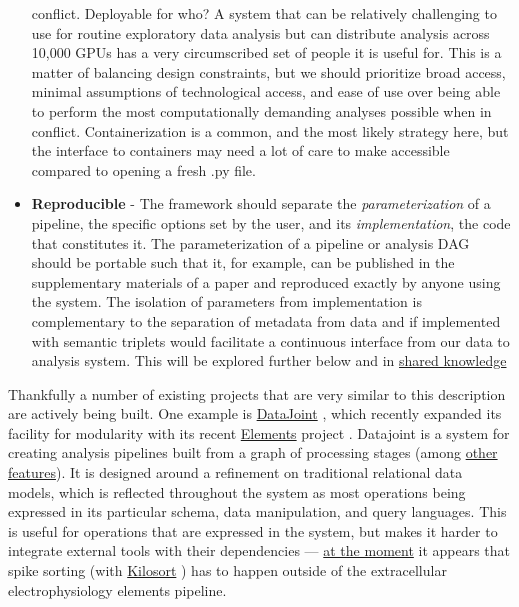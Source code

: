 \documentclass[10pt]{article}
\begin{document}
\begin{multicols}{2}
\begin{itemize}
  conflict. Deployable for who? A system that can be relatively
  challenging to use for routine exploratory data analysis but can
  distribute analysis across 10,000 GPUs has a very circumscribed set of
  people it is useful for. This is a matter of balancing design
  constraints, but we should prioritize broad access, minimal
  assumptions of technological access, and ease of use over being able
  to perform the most computationally demanding analyses possible when
  in conflict. Containerization is a common, and the most likely
  strategy here, but the interface to containers may need a lot of care
  to make accessible compared to opening a fresh .py file.
\item
  \textbf{Reproducible} - The framework should separate the
  \emph{parameterization} of a pipeline, the specific options set by the
  user, and its \emph{implementation}, the code that constitutes it. The
  parameterization of a pipeline or analysis DAG should be portable such
  that it, for example, can be published in the supplementary materials
  of a paper and reproduced exactly by anyone using the system. The
  isolation of parameters from implementation is complementary to the
  separation of metadata from data and if implemented with semantic
  triplets would facilitate a continuous interface from our data to
  analysis system. This will be explored further below and in
  \protect\hyperlink{shared-knowledge}{shared knowledge}
\end{itemize}

Thankfully a number of existing projects that are very similar to this
description are actively being built. One example is
\href{https://datajoint.io/}{DataJoint} \cite{yatsenkoDataJointSimplerRelational2018} , which recently expanded its
facility for modularity with its recent
\href{https://github.com/datajoint/datajoint-elements}{Elements} project
\cite{yatsenkoDataJointElementsData2021} . Datajoint is a system
for creating analysis pipelines built from a graph of processing stages
(among
\href{https://docs.datajoint.org/python/v0.13/intro/01-Data-Pipelines.html\#what-is-datajoint}{other
features}). It is designed around a refinement on traditional relational
data models, which is reflected throughout the system as most operations
being expressed in its particular schema, data manipulation, and query
languages. This is useful for operations that are expressed in the
system, but makes it harder to integrate external tools with their
dependencies ---
\href{https://github.com/datajoint/element-array-ephys/blob/1fdbcf12d1a518e686b6b79e9fbe77b736cb606a/Background.md}{at
the moment} it appears that spike sorting (with
\href{https://github.com/MouseLand/Kilosort}{Kilosort} \cite{pachitariuKilosortRealtimeSpikesorting2016} ) has to happen outside
of the extracellular electrophysiology elements pipeline.


\end{multicols}
\end{document}
